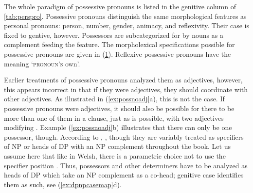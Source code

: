 The whole paradigm of possessive pronouns is listed in the genitive column of
\autoref{tab:perspro}. Possessive pronouns distinguish the same morphological
features as personal pronouns: person, number, gender, animacy, and
reflexivity. Their case is fixed to gentive, however. Possessors are
subcategorized for by nouns as a complement feeding the \Poss{} feature. The
morpholexical specifications possible for possessive pronouns are given in
(\ref{ex:posspromorphlex}). Reflexive possessive pronouns have the meaning
`\textsc{pronoun's} own'.

\begin{figure}
\begin{morphlex}
\ex\label{ex:posspromorphlex}
\xe
\end{morphlex}
\end{figure}

Earlier treatments of possessive pronouns analyzed them as
adjectives, however, this appears incorrect in that if they
were adjectives, they should coordinate
with other adjectives. As illustrated in (\ref{ex:possnoadj}a), this is not the
case. If possessive pronouns were adjectives, it should also
be possible for there to be more than one of them in a clause, just as  is possible, with two adjectives modifying . Example
(\ref{ex:possnoadj}b) illustrates that there can only be one
possessor, though. According to
\citet{bresnan2016}, ,
though they are variably treated as specifiers of NP or heads of DP with an NP complement
throughout the book. Let us assume here that like in Welsh, there
is a parametric choice not to use the specifier position
\parencite[130]{bresnan2016}. Thus, possessors and other determiners have to be
analyzed as heads of DP which take an NP complement as a co-head; genitive case
identifies them as such, see (\ref{ex:dpnpcasemap}d).

